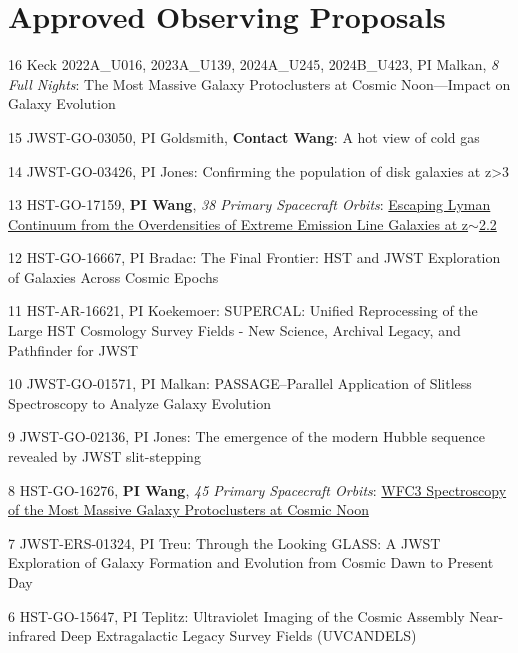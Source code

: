\documentclass[letterpaper,10pt]{article}
\begin{document}
\vspace*{-.7em}
\section{Approved Observing Proposals}

\begin{list}{}{\leftmargin=1.7em}
    \vspace*{1ex}
    \item[16] Keck 2022A\_U016, 2023A\_U139, 2024A\_U245, 2024B\_U423, PI Malkan, \emph{8 Full Nights}: The Most Massive Galaxy Protoclusters at Cosmic Noon---Impact on Galaxy Evolution
    \item[15] JWST-GO-03050, PI Goldsmith, \textbf{Contact Wang}: A hot view of cold gas
    \item[14] JWST-GO-03426, PI Jones: Confirming the population of disk galaxies at z>3
    \item[13] HST-GO-17159, \textbf{PI Wang}, \emph{38 Primary Spacecraft Orbits}: \href{https://archive.stsci.edu/proposal_search.php?id=17159&mission=hst}{Escaping Lyman Continuum from the Overdensities of Extreme Emission Line Galaxies at z$\sim$2.2}
    \item[12] HST-GO-16667, PI Bradac: The Final Frontier: HST and JWST Exploration of Galaxies Across Cosmic Epochs
    \item[11] HST-AR-16621, PI Koekemoer: SUPERCAL: Unified Reprocessing of the Large HST Cosmology Survey Fields - New Science, Archival Legacy, and Pathfinder for JWST
    \item[10] JWST-GO-01571, PI Malkan: PASSAGE--Parallel Application of Slitless Spectroscopy to Analyze Galaxy Evolution
    \item[9] JWST-GO-02136, PI Jones: The emergence of the modern Hubble sequence revealed by JWST slit-stepping
    \item[8] HST-GO-16276, \textbf{PI Wang}, \emph{45 Primary Spacecraft Orbits}: \href{https://archive.stsci.edu/proposal_search.php?id=16276&mission=hst}{WFC3 Spectroscopy of the Most Massive Galaxy Protoclusters at Cosmic Noon}
    \item[7] JWST-ERS-01324, PI Treu: Through the Looking GLASS: A JWST Exploration of Galaxy Formation and Evolution from Cosmic Dawn to Present Day
    \item[6] HST-GO-15647, PI Teplitz: Ultraviolet Imaging of the Cosmic Assembly Near-infrared Deep Extragalactic Legacy Survey Fields (UVCANDELS)

\end{list}
\end{document}
